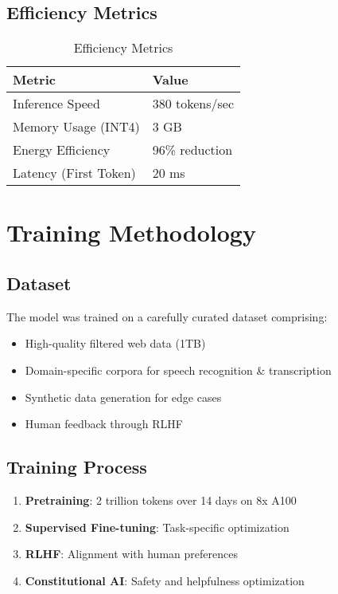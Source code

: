 \documentclass[11pt,a4paper]{article}
\begin{document}
\subsection{Efficiency Metrics}

\begin{table}[H]
\centering
\begin{tabular}{ll}
\toprule
\textbf{Metric} & \textbf{Value} \\
\midrule
Inference Speed & 380 tokens/sec \\
Memory Usage (INT4) & 3 GB \\
Energy Efficiency & 96\% reduction \\
Latency (First Token) & 20 ms \\
\bottomrule
\end{tabular}
\caption{Efficiency Metrics}
\end{table}

\section{Training Methodology}

\subsection{Dataset}
The model was trained on a carefully curated dataset comprising:
\begin{itemize}
    \item High-quality filtered web data (1TB)
    \item Domain-specific corpora for speech recognition & transcription
    \item Synthetic data generation for edge cases
    \item Human feedback through RLHF
\end{itemize}

\subsection{Training Process}
\begin{enumerate}
    \item \textbf{Pretraining}: 2 trillion tokens over 14 days on 8x A100
    \item \textbf{Supervised Fine-tuning}: Task-specific optimization
    \item \textbf{RLHF}: Alignment with human preferences
    \item \textbf{Constitutional AI}: Safety and helpfulness optimization
\end{enumerate}
\end{document}
